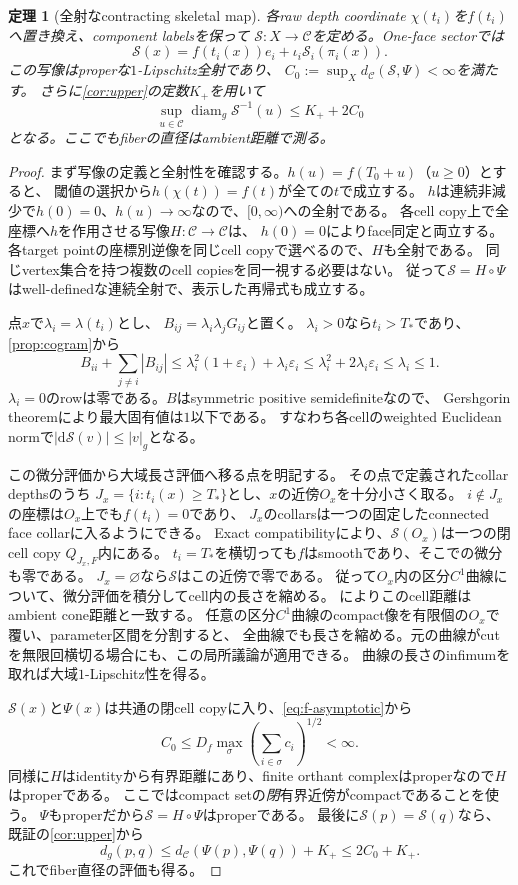 \documentclass[11pt,a4paper]{ltjsarticle}
\newcommand{\dd}{\mathrm d}
\newcommand{\diam}{\operatorname{diam}}
\newcommand{\cC}{\mathcal C}
\newcommand{\cS}{\mathcal S}
\theoremstyle{plain}
\newtheorem{theorem}{定理}[section]
\theoremstyle{definition}
\theoremstyle{remark}
\begin{document}
\begin{theorem}[全射なcontracting skeletal map]
\label{thm:contract}
各raw depth coordinate $\chi(t_i)$を$f(t_i)$へ置き換え、component labelsを保って
$\cS:X\to\cC$を定める。One-face sectorでは
\[
 \cS(x)=f(t_i(x))e_i+\iota_i\cS_i(\pi_i(x)).
\]
この写像はproperな$1$-Lipschitz\emph{全射}であり、
$C_0:=\sup_X d_\cC(\cS,\Psi)<\infty$を満たす。
さらに\cref{cor:upper}の定数$K_+$を用いて
\[
 \sup_{u\in\cC}\diam_g\cS^{-1}(u)\le K_++2C_0
\]
となる。ここでもfiberの直径はambient距離で測る。
\end{theorem}
\begin{proof}
まず写像の定義と全射性を確認する。$h(u)=f(T_0+u)$（$u\ge0$）とすると、
閾値の選択から$h(\chi(t))=f(t)$が全ての$t$で成立する。
$h$は連続非減少で$h(0)=0$、$h(u)\to\infty$なので、$[0,\infty)$への全射である。
各cell copy上で全座標へ$h$を作用させる写像$H:\cC\to\cC$は、
$h(0)=0$によりface同定と両立する。
各target pointの座標別逆像を同じcell copyで選べるので、$H$も全射である。
同じvertex集合を持つ複数のcell copiesを同一視する必要はない。
従って$\cS=H\circ\Psi$はwell-definedな連続全射で、表示した再帰式も成立する。

点$x$で$\lambda_i=\lambda(t_i)$とし、
$B_{ij}=\lambda_i\lambda_jG_{ij}$と置く。
$\lambda_i>0$なら$t_i>T_*$であり、\cref{prop:cogram}から
\[
 B_{ii}+\sum_{j\ne i}|B_{ij}|
 \le\lambda_i^2(1+\varepsilon_i)+\lambda_i\varepsilon_i
 \le\lambda_i^2+2\lambda_i\varepsilon_i
 \le\lambda_i\le1.
\]
$\lambda_i=0$のrowは零である。$B$はsymmetric positive semidefiniteなので、
Gershgorin theoremにより最大固有値は$1$以下である。
すなわち各cellのweighted Euclidean normで$|\dd\cS(v)|\le|v|_g$となる。

この微分評価から大域長さ評価へ移る点を明記する。
その点で定義されたcollar depthsのうち
$J_x=\{i:t_i(x)\ge T_*\}$とし、$x$の近傍$O_x$を十分小さく取る。
$i\notin J_x$の座標は$O_x$上でも$f(t_i)=0$であり、
$J_x$のcollarsは一つの固定したconnected face collarに入るようにできる。
Exact compatibilityにより、$\cS(O_x)$は一つの閉cell copy $Q_{J_x,F}$内にある。
$t_i=T_*$を横切っても$f$はsmoothであり、そこでの微分も零である。
$J_x=\varnothing$なら$\cS$はこの近傍で零である。
従って$O_x$内の区分$C^1$曲線について、微分評価を積分してcell内の長さを縮める。
によりこのcell距離はambient cone距離と一致する。
任意の区分$C^1$曲線のcompact像を有限個の$O_x$で覆い、parameter区間を分割すると、
全曲線でも長さを縮める。元の曲線がcutを無限回横切る場合にも、この局所議論が適用できる。
曲線の長さのinfimumを取れば大域$1$-Lipschitz性を得る。

$\cS(x)$と$\Psi(x)$は共通の閉cell copyに入り、\eqref{eq:f-asymptotic}から
\[
 C_0\le D_f\max_\sigma\left(\sum_{i\in\sigma}c_i\right)^{1/2}<\infty.
\]
同様に$H$はidentityから有界距離にあり、finite orthant complexはproperなので$H$はproperである。
ここではcompact setの\emph{閉}有界近傍がcompactであることを使う。
$\Psi$もproperだから$\cS=H\circ\Psi$はproperである。
最後に$\cS(p)=\cS(q)$なら、既証の\cref{cor:upper}から
\[
 d_g(p,q)\le d_\cC(\Psi(p),\Psi(q))+K_+\le2C_0+K_+.
\]
これでfiber直径の評価も得る。
\end{proof}
\end{document}
